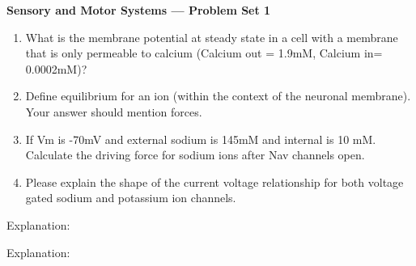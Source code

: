 \documentclass[plain,worksheet]{inVerba-notes}
\begin{document}
\begin{center}
    \Large \textbf{Sensory and Motor Systems --- Problem Set 1}
\end{center}
\medskip
\begin{enumerate}
    \item What is the membrane potential at steady state in a cell with a membrane that is only permeable to calcium (Calcium out = 1.9mM, Calcium in= 0.0002mM)? 
    
    
    \vspace{80pt}

    \item Define equilibrium for an ion (within the context of the neuronal membrane). Your answer should mention forces.
    
    \vspace{80pt}

    \item If Vm is -70mV and external sodium is 145mM and internal is 10 mM. Calculate the driving force for sodium ions after Nav channels open.
    
    \vspace{120pt}

    \item Please explain the shape of the current voltage relationship for both voltage gated sodium and potassium ion channels.
\end{enumerate}
    \bigskip
    
    \begin{center}
        
    \end{center}

    Explanation:
    \vspace{80pt}
     
    \begin{center}
    
    \end{center}

    Explanation:
    \vspace{80pt}
\end{document}
